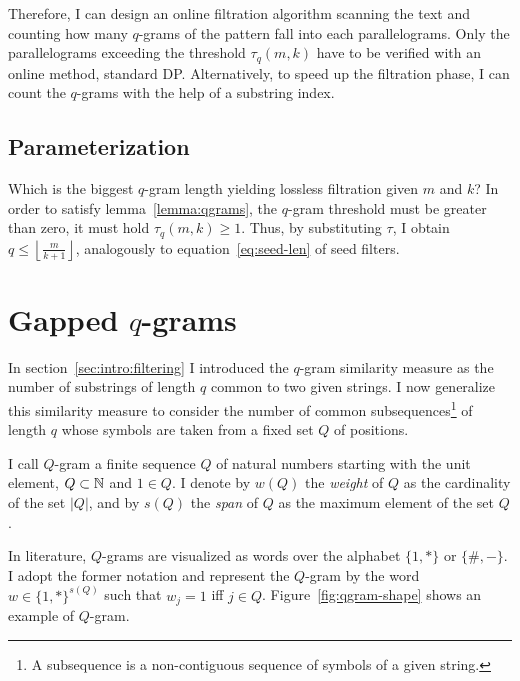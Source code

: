 Therefore, I can design an online filtration algorithm scanning the text and counting how many $q$-grams of the pattern fall into each parallelograms.
Only the parallelograms exceeding the threshold $\tau_q(m,k)$ have to be verified with an online method, \eg standard DP.
Alternatively, to speed up the filtration phase, I can count the $q$-grams with the help of a substring index.

\subsection{Parameterization}

Which is the biggest $q$-gram length yielding lossless filtration given $m$ and $k$?
In order to satisfy lemma~\ref{lemma:qgrams}, the $q$-gram threshold must be greater than zero, \ie it must hold $\tau_q(m,k) \geq 1$.
Thus, by substituting $\tau$, I obtain $q \leq \left \lfloor \frac{m}{k+1} \right \rfloor$, analogously to equation~\ref{eq:seed-len} of seed filters.


\section{Gapped $q$-grams}

In section~\ref{sec:intro:filtering} I introduced the $q$-gram similarity measure as the number of substrings of length $q$ common to two given strings.
I now generalize this similarity measure to consider the number of common subsequences\footnote{A subsequence is a non-contiguous sequence of symbols of a given string.} of length $q$ whose symbols are taken from a fixed set $Q$ of positions.

\begin{definition}
I call $Q$-gram a finite sequence $Q$ of natural numbers starting with the unit element, \ie $Q \subset \mathbb {N}$ and $1 \in Q$.
I denote by $w(Q)$ the \emph{weight} of $Q$ as the cardinality of the set $|Q|$, and by $s(Q)$ the \emph{span} of $Q$ as the maximum element of the set $Q$.
\end{definition}

In literature, $Q$-grams are visualized as words over the alphabet $\{1,*\}$ or $\{\#,-\}$.
I adopt the former notation and represent the $Q$-gram by the word $w \in \{1,*\}^{s(Q)}$ such that $w_j=1$ iff $j \in Q$.
Figure~\ref{fig:qgram-shape} shows an example of $Q$-gram.

